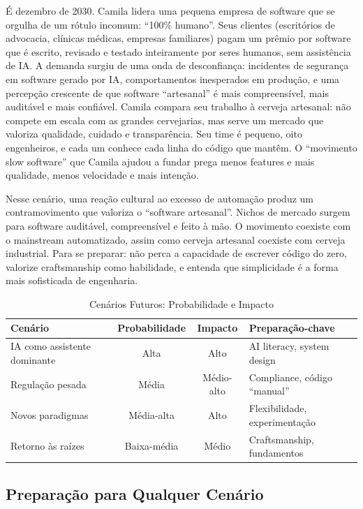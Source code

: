 É dezembro de 2030. Camila lidera uma pequena empresa de software que se orgulha de um rótulo incomum: ``100\% humano''. Seus clientes (escritórios de advocacia, clínicas médicas, empresas familiares) pagam um prêmio por software que é escrito, revisado e testado inteiramente por seres humanos, sem assistência de IA. A demanda surgiu de uma onda de desconfiança: incidentes de segurança em software gerado por IA, comportamentos inesperados em produção, e uma percepção crescente de que software ``artesanal'' é mais compreensível, mais auditável e mais confiável. Camila compara seu trabalho à cerveja artesanal: não compete em escala com as grandes cervejarias, mas serve um mercado que valoriza qualidade, cuidado e transparência. Seu time é pequeno, oito engenheiros, e cada um conhece cada linha do código que mantêm. O ``movimento slow software'' que Camila ajudou a fundar prega menos features e mais qualidade, menos velocidade e mais intenção.

Nesse cenário, uma reação cultural ao excesso de automação produz um contramovimento que valoriza o ``software artesanal''. Nichos de mercado surgem para software auditável, compreensível e feito à mão. O movimento coexiste com o mainstream automatizado, assim como cerveja artesanal coexiste com cerveja industrial. Para se preparar: não perca a capacidade de escrever código do zero, valorize craftsmanship como habilidade, e entenda que simplicidade é a forma mais sofisticada de engenharia.

\begin{table}[h]
\centering
\caption{Cenários Futuros: Probabilidade e Impacto}
\begin{tabular}{p{4cm} c c p{4cm}}
\toprule
\textbf{Cenário} & \textbf{Probabilidade} & \textbf{Impacto} & \textbf{Preparação-chave} \\
\midrule
IA como assistente dominante & Alta & Alto & AI literacy, system design \\
Regulação pesada & Média & Médio-alto & Compliance, código ``manual'' \\
Novos paradigmas & Média-alta & Alto & Flexibilidade, experimentação \\
Retorno às raízes & Baixa-média & Médio & Craftsmanship, fundamentos \\
\bottomrule
\end{tabular}
\end{table}

\subsection{Preparação para Qualquer Cenário}

